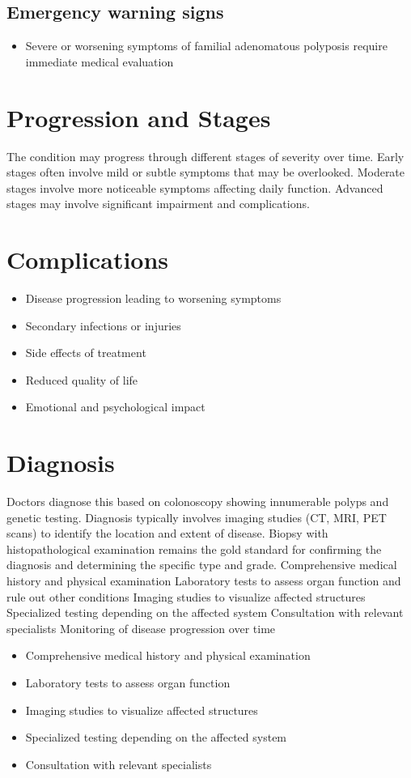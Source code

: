 \subsection{Emergency warning signs}
\begin{itemize}[noitemsep]
  \item Severe or worsening symptoms of familial adenomatous polyposis require immediate medical evaluation
\end{itemize}
\section{Progression and Stages}
The condition may progress through different stages of severity over time. Early stages often involve mild or subtle symptoms that may be overlooked. Moderate stages involve more noticeable symptoms affecting daily function. Advanced stages may involve significant impairment and complications.
\section{Complications}
\begin{itemize}[noitemsep]
  \item Disease progression leading to worsening symptoms
  \item Secondary infections or injuries
  \item Side effects of treatment
  \item Reduced quality of life
  \item Emotional and psychological impact
\end{itemize}
\section{Diagnosis}
Doctors diagnose this based on colonoscopy showing innumerable polyps and genetic testing. Diagnosis typically involves imaging studies (CT, MRI, PET scans) to identify the location and extent of disease. Biopsy with histopathological examination remains the gold standard for confirming the diagnosis and determining the specific type and grade. Comprehensive medical history and physical examination Laboratory tests to assess organ function and rule out other conditions Imaging studies to visualize affected structures Specialized testing depending on the affected system Consultation with relevant specialists Monitoring of disease progression over time

\begin{itemize}[noitemsep]
  \item Comprehensive medical history and physical examination
  \item Laboratory tests to assess organ function
  \item Imaging studies to visualize affected structures
  \item Specialized testing depending on the affected system
  \item Consultation with relevant specialists
\end{itemize}
